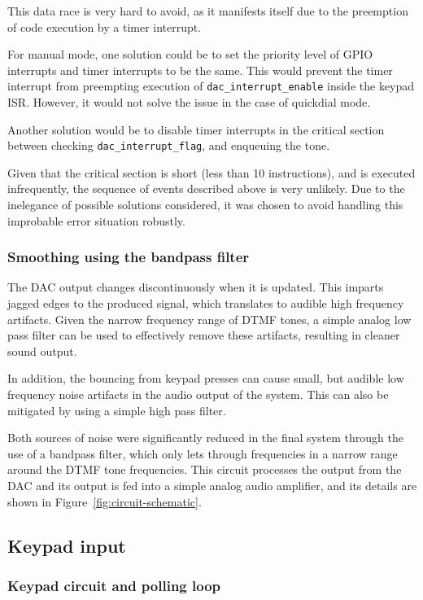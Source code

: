 \documentclass[11pt,a4paper,twocolumn]{scrartcl}
\begin{document}
This data race is very hard to avoid, as it manifests itself due to the preemption of code execution by a timer interrupt. 

For manual mode, one solution could be to set the priority level of GPIO interrupts and timer interrupts to be the same. This would prevent the timer interrupt from preempting execution of \verb!dac_interrupt_enable! inside the keypad ISR. However, it would not solve the issue in the case of quickdial mode.

Another solution would be to disable timer interrupts in the critical section between checking \verb!dac_interrupt_flag!, and enqueuing the tone.

Given that the critical section is short (less than 10 instructions), and is executed infrequently, the sequence of events described above is very unlikely. Due to the inelegance of possible solutions considered, it was chosen to avoid handling this improbable error situation robustly.

\subsubsection{Smoothing using the bandpass filter}

The DAC output changes discontinuously when it is updated. This imparts jagged edges to the produced signal, which translates to audible high frequency artifacts. Given the narrow frequency range of DTMF tones, a simple analog low pass filter can be used to effectively remove these artifacts, resulting in cleaner sound output. 

In addition, the bouncing from keypad presses can cause small, but audible low frequency noise artifacts in the audio output of the system. This can also be mitigated by using a simple high pass filter.

Both sources of noise were significantly reduced in the final system through the use of a bandpass filter, which only lets through frequencies in a narrow range around the DTMF tone frequencies. This circuit processes the output from the DAC and its output is fed into a simple analog audio amplifier, and its details are shown in Figure~\ref{fig:circuit-schematic}.

\subsection{Keypad input} \label{keypad}

\subsubsection{Keypad circuit and polling loop}
\end{document}
